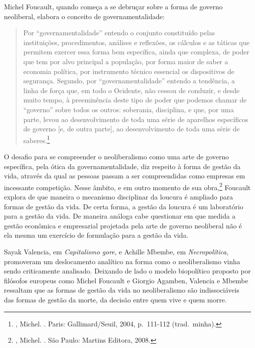 Michel Foucault, quando começa a se debruçar sobre a forma de governo
neoliberal, elabora o conceito de governamentalidade:

\begin{quote}
Por ``governamentalidade'' entendo o conjunto constituído pelas
instituições, procedimentos, análises e reﬂexões, os cálculos e as
táticas que permitem exercer essa forma bem especíﬁca, ainda que
complexa, de poder que tem por alvo principal a população, por forma
maior de saber a economia política, por instrumento técnico essencial os
dispositivos de segurança. Segundo, por ``governamentalidade'' entendo a
tendência, a linha de força que, em todo o Ocidente, não cessou de
conduzir, e desde muito tempo, à preeminência deste tipo de poder que
podemos chamar de ``governo'' sobre todos os outros: soberania,
disciplina, e que, por uma parte, levou ao desenvolvimento de toda uma
série de aparelhos especíﬁcos de governo {[}e, de outra parte{]}, ao
desenvolvimento de toda uma série de saberes.\footnote{,
  Michel. {}. Paris: Gallimard/Seuil, 2004, p.~111-112 (trad.~minha).}
\end{quote}

O desafio para se compreender o neoliberalismo como uma arte de governo
específica, pela ótica da governamentalidade, diz respeito à forma de
gestão da vida, através da qual as pessoas passam a ser compreendidas como empresas em
incessante competição. Nesse âmbito, e em outro momento de sua
obra,\footnote{, Michel. {}. São Paulo: Martins Editora, 2008.}
Foucault explora de que maneira o mecanismo disciplinar da loucura é
ampliado para formas de gestão da vida. De certa forma, a gestão da
loucura é um laboratório para a gestão da vida. De maneira análoga cabe
questionar em que medida a gestão econômica e empresarial projetada pela
arte de governo neoliberal não é ela mesma um exercício de formulação
para a gestão da vida.

Sayak Valencia, em \emph{Capitalismo gore}, e Achille Mbembe, em
\emph{Necropolítica}, promoveram um deslocamento analítico na forma como
o neoliberalismo vinha sendo criticamente analisado. Deixando de lado o
modelo biopolítico proposto por filósofos europeus como Michel Foucault
e Giorgio Agamben, Valencia e Mbembe ressaltam que as formas
de gestão da vida no neoliberalismo são indissociáveis das formas de
gestão da morte, da decisão entre quem vive e quem morre.

